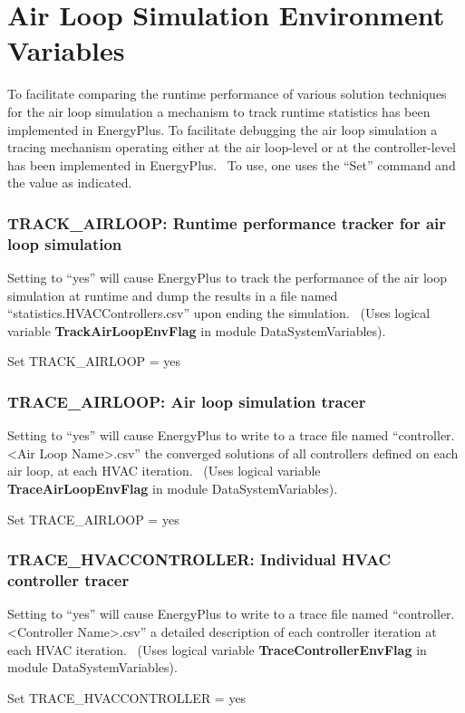 \section{Air Loop Simulation Environment Variables}\label{air-loop-simulation-environment-variables}

To facilitate comparing the runtime performance of various solution techniques for the air loop simulation a mechanism to track runtime statistics has been implemented in EnergyPlus. To facilitate debugging the air loop simulation a tracing mechanism operating either at the air loop-level or at the controller-level has been implemented in EnergyPlus.~ To use, one uses the ``Set'' command and the value as indicated.

\subsubsection{TRACK\_AIRLOOP: Runtime performance tracker for air loop simulation}\label{trackux5fairloop-runtime-performance-tracker-for-air-loop-simulation}

Setting to ``yes'' will cause EnergyPlus to track the performance of the air loop simulation at runtime and dump the results in a file named ``statistics.HVACControllers.csv'' upon ending the simulation.~ (Uses logical variable \textbf{TrackAirLoopEnvFlag} in module DataSystemVariables).

Set TRACK\_AIRLOOP = yes

\subsubsection{TRACE\_AIRLOOP: Air loop simulation tracer}\label{traceux5fairloop-air-loop-simulation-tracer}

Setting to ``yes'' will cause EnergyPlus to write to a trace file named ``controller.\textless{}Air Loop Name\textgreater{}.csv'' the converged solutions of all controllers defined on each air loop, at each HVAC iteration.~ (Uses logical variable \textbf{TraceAirLoopEnvFlag} in module DataSystemVariables).

Set TRACE\_AIRLOOP = yes

\subsubsection{TRACE\_HVACCONTROLLER: Individual HVAC controller tracer}\label{traceux5fhvaccontroller-individual-hvac-controller-tracer}

Setting to ``yes'' will cause EnergyPlus to write to a trace file named ``controller.\textless{}Controller Name\textgreater{}.csv'' a detailed description of each controller iteration at each HVAC iteration.~ (Uses logical variable \textbf{TraceControllerEnvFlag} in module DataSystemVariables).

Set TRACE\_HVACCONTROLLER = yes

